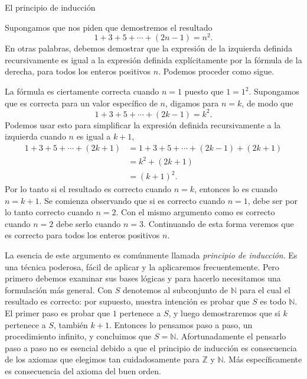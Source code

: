\begin{section}{El principio de inducción}\label{1.4}

Supongamos que nos piden que demostremos el resultado
$$
1+3+5+\cdots+(2n-1) = n^2.
$$
En otras palabras, debemos demostrar que la expresión de la izquierda definida recursivamente es igual a la expresión definida explícitamente por la fórmula de la derecha, para todos los enteros positivos $n$. Podemos proceder como sigue.

La fórmula es ciertamente correcta cuando $n=1$ puesto que $1=1^2$.  Supongamos que es correcta para un valor específico de $n$, digamos para $n=k$, de modo que
$$
1+3+5+\cdots+(2k-1) = k^2.
$$
Podemos usar esto para simplificar la expresión definida recursivamente a la izquierda cuando $n$ es igual a $k+1$,
$$
\begin{aligned}
1+3+5+\cdots+(2k+1) &= 1+3+5+\cdots+(2k-1) +(2k+1) \\
&=k^2 +(2k+1) \\
&=(k+1)^2.
\end{aligned}
$$
Por lo tanto si el resultado es correcto cuando $n=k$, entonces lo es cuando $n=k+1$. Se comienza observando que si es correcto cuando $n=1$, debe ser por lo tanto correcto cuando $n=2$. Con el mismo argumento como es correcto cuando $n=2$ debe serlo cuando $n=3$. Continuando de esta forma veremos que es correcto para todos los enteros positivos $n$.

La esencia de este argumento es comúnmente llamada \textit{principio de inducción}. Es una técnica poderosa, fácil de aplicar y la aplicaremos frecuentemente. Pero primero debemos examinar sus bases lógicas y para hacerlo necesitamos una formulación más general. Con $S$ denotemos al subconjunto de $\mathbb N$ para el cual el resultado es correcto: por supuesto, nuestra intención es probar que $S$ es todo $\mathbb N$. El primer paso es probar que $1$ pertenece a $S$, y luego demostraremos que si $k$ pertenece a $S$, también $k+1$. Entonces lo pensamos paso a paso, un procedimiento infinito, y concluimos que $S=\mathbb N$. Afortunadamente el pensarlo paso a paso no es esencial debido a que el principio de inducción es consecuencia de los axiomas que elegimos tan cuidadosamente para $\mathbb Z$ y $\mathbb N$. Más específicamente es consecuencia del axioma del buen orden.


\end{section}
